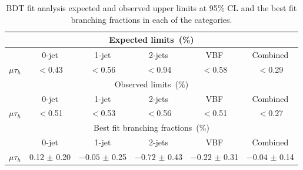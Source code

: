 \begin{table}[!htpb]
 \centering
  \caption{BDT fit analysis expected and observed upper limits at 95\% CL and the best fit branching fractions in each of the categories.}
 \label{tab:expected_limits_BDTMethod2_MuTau}
\begin{tabular}{*{6}{c}}
\multicolumn{6}{c}{Expected limits~(\%) } \\ \hline
                       &  \multicolumn{1}{c}{0-jet}   & \multicolumn{1}{c}{1-jet}    &  \multicolumn{1}{c}{2-jets} & \multicolumn{1}{c}{VBF}  & \multicolumn{1}{c}{Combined}                 \\  \cline{2-6}
$\mu\tau_{h}$      &  $<$0.43      &  $<$0.56      &  $<$0.94      &  $<$0.58      &  $<$0.29    \\
\multicolumn{6}{c}{Observed limits~(\%)} \\ \hline
                       &  \multicolumn{1}{c}{0-jet}   & \multicolumn{1}{c}{1-jet}    &  \multicolumn{1}{c}{2-jets} & \multicolumn{1}{c}{VBF} &\multicolumn{1}{c}{Combined}                 \\ \cline{2-6}
$\mu\tau_{h}$              & $<$0.51       & $<$0.53       & $<$0.56       & $<$0.51       & $<$0.27    \\
\multicolumn{6}{c}{Best fit branching fractions~(\%)} \\ \hline
                       &  \multicolumn{1}{c}{0-jet}   & \multicolumn{1}{c}{1-jet}    &  \multicolumn{1}{c}{2-jets} & \multicolumn{1}{c}{VBF} &\multicolumn{1}{c}{Combined}                 \\  \cline{2-6}
$\mu\tau_{h}$              & 0.12 $\pm$ 0.20       & $-0.05$ $\pm$ 0.25    & $-0.72$ $\pm$ 0.43    & $-0.22$ $\pm$ 0.31    & $-0.04$ $\pm$ 0.14  \\  \hline
  \end{tabular}
\end{table}



